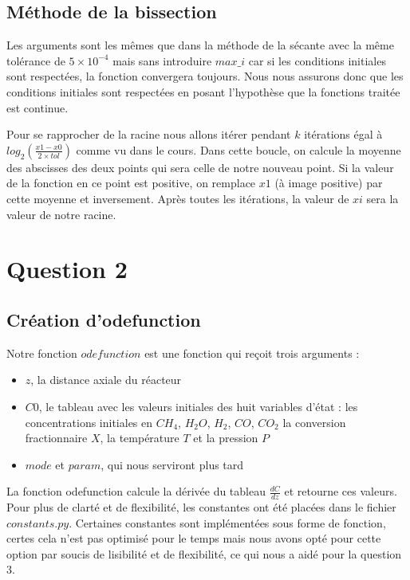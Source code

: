 \documentclass[11pt]{report}
\newcommand{\mychapter}[2]{
    \setcounter{chapter}{#1}
    \setcounter{section}{0}
    \chapter*{#2}
    \addcontentsline{toc}{chapter}{#2}
}
\begin{document}
        \section{Méthode de la bissection}
            Les arguments sont les mêmes que dans la méthode de la sécante avec la même tolérance de $5\times10^{-4}$ mais sans introduire $max\_i$
            car si les conditions initiales sont respectées, la fonction convergera toujours.
            Nous nous assurons donc que les conditions initiales sont respectées en posant l'hypothèse que la fonctions traitée est continue.
            \par
            Pour se rapprocher de la racine nous allons itérer pendant $k$ itérations égal à\\
            $log_2(\frac{x1-x0}{2{\times}tol})$ comme vu dans le cours.
            Dans cette boucle, on calcule la moyenne des abscisses des deux points qui sera celle de notre nouveau point.
            Si la valeur de la fonction en ce point est positive, on remplace $x1$ (à image positive) par cette moyenne et inversement.
            Après toutes les itérations, la valeur de $xi$ sera la valeur de notre racine.

    \mychapter{2}{Question 2}
        \section{Création d'odefunction}
            Notre fonction $odefunction$ est une fonction qui reçoit trois arguments :
            \begin{itemize}
                \item $z$, la distance axiale  du réacteur
                \item $C0$, le tableau avec les valeurs initiales des huit variables d'état :
                    les concentrations initiales en $CH_4$, $H_2O$, $H_2$, $CO$, $CO_2$
                    la conversion fractionnaire $X$,
                    la température $T$
                    et la pression $P$
                \item $mode$ et $param$, qui nous serviront plus tard
            \end{itemize}
            La fonction odefunction calcule la dérivée du tableau $\frac{dC}{dz}$ et retourne ces valeurs.
            Pour plus de clarté et de flexibilité, les constantes ont été placées dans le fichier $constants.py$.
            Certaines constantes sont implémentées sous forme de fonction,
            certes cela n'est pas optimisé pour le temps mais nous avons opté pour cette option par soucis de lisibilité
            et de flexibilité, ce qui nous a aidé pour la question 3.
\end{document}
